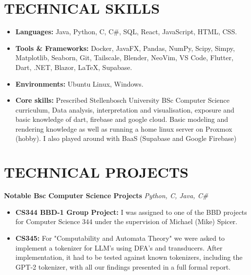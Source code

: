 \documentclass[11pt,a4paper]{article}
\begin{document}
\newpage

\section{TECHNICAL SKILLS}
\begin{itemize}
    \item \textbf{Languages:} Java, Python, C, C\#, SQL, React, JavaScript, HTML, CSS.
		
	\vspace{2pt}


    \item \textbf{Tools \& Frameworks:} Docker, JavaFX, Pandas, NumPy, Scipy, Simpy, Matplotlib,
		Seaborn, Git, Tailscale, Blender, NeoVim, VS Code, Flutter, Dart, .NET,
		Blazor, \LaTeX, Supabase.
		
	\vspace{2pt}


    \item \textbf{Environments:} Ubuntu Linux, Windows.
		
	\vspace{2pt}


    \item \textbf{Core skills:} Prescribed Stellenbosch University BSc Computer
		Science curriculum, Data analysis, interpretation and visualisation,
		exposure and basic knowledge of dart, firebase and google cloud. Basic
		modeling and rendering knowledge as well as running a home linux server
		on Proxmox (hobby). I also played around with BaaS (Supabase and Google
		Firebase)
\end{itemize}

\section{TECHNICAL PROJECTS}

\noindent\textbf{Notable Bsc Computer Science Projects} \hfill \textit{Python, C, Java, C\#}

	\vspace{5pt}
\begin{itemize}
	\item \textbf{CS344 BBD-1 Group Project:} I was assigned to one of the BBD
		projects for Computer Science 344 under the supervision of Michael
		(Mike) Spicer.

\end{itemize}

\begin{itemize}
	\item \textbf{CS345:} For "Computability and Automata Theory" we were
		asked to implement a tokenizer for LLM's using DFA's and transducers.
		After implementation, it had to be tested against known tokenizers,
		including the GPT-2 tokenizer, with all our findings presented in a full
		formal report.

\end{itemize}
	\vspace{10pt}
\end{document}
